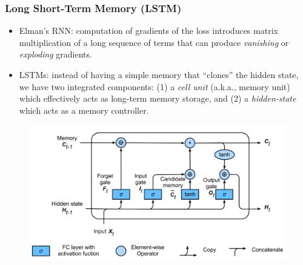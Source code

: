 \documentclass{beamer}
\begin{document}
		\begin{frame}
			\frametitle{Long Short-Term Memory (LSTM)}
			
			\begin{itemize}
				\item Elman's RNN: computation of gradients of the loss introduces matrix multiplication of a long sequence of terms that can produce \textit{vanishing} or \textit{exploding} gradients.
				\item LSTMs: instead of having a simple memory that “clones” the hidden state, we have two integrated components: (1) a \textit{cell unit} (a.k.a., memory unit) which effectively acts as long-term memory storage, and (2) a \textit{hidden-state} which acts as a memory controller.
			\end{itemize}
		
			\begin{figure}
				\centering
				\includegraphics[scale=0.39]{images/lstm}
			\end{figure}
			
		\end{frame}
		
\end{document}
